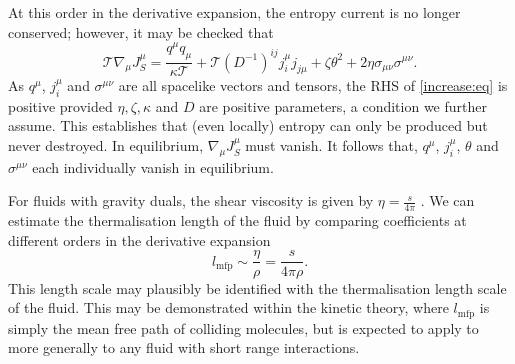 \documentclass[12pt]{article}
\newcommand{\tloc}{\mathcal{T}}
\newcommand{\mfp}{l_{\mathrm{mfp}}}
\begin{document}
At this order in the derivative expansion, the entropy current is no longer conserved; however, it may be checked \cite{Andersson:2006nr} that
%
\begin{equation}\label{increase:eq}
\tloc\nabla_\mu J^\mu_S = \frac{q^\mu q_\mu}{\kappa \tloc}
+ \tloc (D^{-1})^{ij} j_i^\mu j_{j\mu}  + \zeta \theta ^2
+ 2 \eta \sigma_{\mu \nu} \sigma^{\mu \nu}.
\end{equation}
%
As $q^\mu$, $j^\mu_i$ and $\sigma^{\mu \nu}$ are all spacelike
vectors and tensors, the RHS of \eqref{increase:eq} is positive provided
$\eta, \zeta, \kappa$ and $D$ are positive parameters, a condition we further assume. This establishes that (even locally) entropy can only be produced but never destroyed. In equilibrium, $\nabla_\mu J^\mu_S$ must vanish. It follows that, $q^\mu$, $j^\mu_i$, $\theta$ and $\sigma^{\mu \nu}$
each individually vanish in equilibrium.

For fluids with gravity duals, the shear viscosity is given by $\eta=\frac{s}{4\pi}$ \cite{Son:2007vk}. We can estimate the thermalisation length of the fluid by comparing coefficients at different orders in the derivative expansion
%
\begin{equation}\label{mfp:eq}
  \mfp \sim \frac{\eta}{\rho} = \frac{s}{4\pi\rho}.
\end{equation}
%
This length scale may plausibly be identified with the thermalisation length scale of the fluid. This may be demonstrated within the kinetic theory, where $\mfp$ is simply the mean free path of colliding molecules, but is expected to apply to more generally to any fluid with short range interactions.

\end{document}
